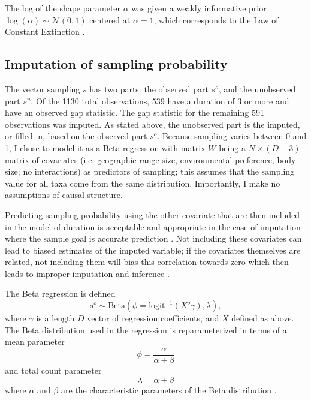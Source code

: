 \documentclass{article}
\begin{document}
The log of the shape parameter \(\alpha\) was given a weakly informative prior \(\log(\alpha) \sim \mathcal{N}(0, 1)\) centered at \(\alpha = 1\), which corresponds to the Law of Constant Extinction \citep{VanValen1973}.

\subsection{Imputation of sampling probability}
\label{sec:impute}
The vector sampling \(s\) has two parts: the observed part \(s^{o}\), and the unobserved part \(s^{u}\). Of the 1130 total observations, 539 have a duration of 3 or more and have an observed gap statistic. The gap statistic for the remaining 591 observations was imputed. As stated above, the unobserved part is the imputed, or filled in, based on the observed part \(s^{o}\). Because sampling varies between 0 and 1, I chose to model it as a Beta regression with matrix \(W\) being a \(N \times (D - 3)\) matrix of covariates (i.e. geographic range size, environmental preference, body size; no interactions) as predictors of sampling; this assumes that the sampling value for all taxa come from the same distribution. Importantly, I make no assumptions of causal structure. 

Predicting sampling probability using the other covariate that are then included in the model of duration is acceptable and appropriate in the case of imputation where the sample goal is accurate prediction \citep{Rubin1996,Gelman2007}. Not including these covariates can lead to biased estimates of the imputed variable; if the covariates themselves are related, not including them will bias this correlation towards zero which then leads to improper imputation and inference \citep{Rubin1996}.

The Beta regression is defined
\begin{equation}
  s^{o} \sim \mathrm{Beta}(\phi = \text{logit}^{-1}(X^{o} \gamma), \lambda),
  \label{eq:impute}
\end{equation}
where \(\gamma\) is a length \(D\) vector of regression coefficients, and \(X\) defined as above. The Beta distribution used in the regression is reparameterized in terms of a mean parameter
\begin{equation}
  \phi = \frac{\alpha}{\alpha + \beta}
\end{equation}
and total count parameter
\begin{equation}
  \lambda = \alpha + \beta
\end{equation}
where \(\alpha\) and \(\beta\) are the characteristic parameters of the Beta distribution \citep{Gelman2013d}.
\end{document}
